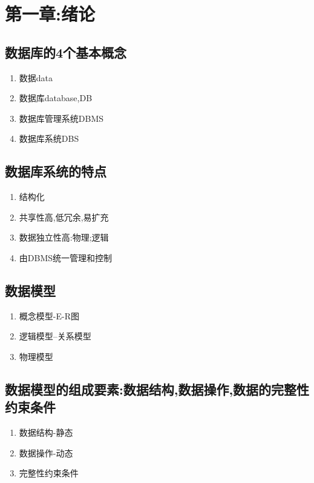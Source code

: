 

\section{第一章:绪论}

\subsection{数据库的4个基本概念}
\begin{enumerate}
    \item 数据data
    \item 数据库database,DB
    \item 数据库管理系统DBMS
    \item 数据库系统DBS
\end{enumerate}
\subsection{数据库系统的特点}
\begin{enumerate}
    \item 结构化
    \item 共享性高,低冗余,易扩充
    \item 数据独立性高:物理;逻辑
    \item 由DBMS统一管理和控制
\end{enumerate}
\subsection{数据模型}
\begin{enumerate}
    \item 概念模型-E-R图
    \item 逻辑模型--关系模型
    \item 物理模型
\end{enumerate}
\subsection{数据模型的组成要素:数据结构,数据操作,数据的完整性约束条件}
\begin{enumerate}
    \item 数据结构-静态
    \item 数据操作-动态
    \item 完整性约束条件
\end{enumerate}
